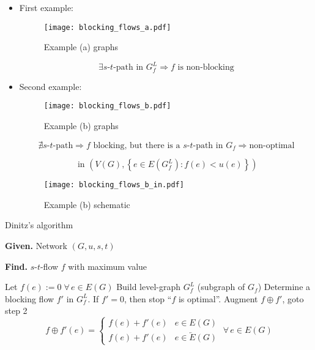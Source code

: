 \documentclass{article}
\newcommand{\set}[1]{\left\{#1\right\}}
\newcommand{\given}[1]{\textbf{Given.} #1\par}
\newcommand{\find}[1]{\textbf{Find.} #1\par}
\newcommand{\gath}[2]{$#1$-$#2$-path} %
\newcommand{\fall}{\;\forall\,}
\begin{document}
\begin{itemize}
  \item First example:
    \begin{figure}[!h]
      \begin{center}
       \texttt{[image: blocking\_flows\_a.pdf]}
       \caption{Example (a) graphs}
      \end{center}
    \end{figure}

    \[
      \exists \text{\gath st in }  G^L_f
        \Rightarrow f \text{ is non-blocking}
    \]

  \item Second example:
    \begin{figure}[!h]
      \begin{center}
       \texttt{[image: blocking\_flows\_b.pdf]}
       \caption{Example (b) graphs}
      \end{center}
    \end{figure}

    \[
      \nexists \text{\gath st}
        \Rightarrow f \text{ blocking, but there is a \gath st in } G_f \Rightarrow \text{non-optimal}
    \]

    \[
      \text{ in } (V(G), \set{e \in E(G^L_f): f(e) < u(e)})
    \]
    \begin{figure}[!h]
      \begin{center}
       \texttt{[image: blocking\_flows\_b\_in.pdf]}
       \caption{Example (b) schematic}
      \end{center}
    \end{figure}
\end{itemize}


\begin{algorithm}
  \caption{Dinitz's algorithm}
  \label{dinitz-algo}
  \given{Network $(G, u, s, t)$}
  \find{$s$-$t$-flow $f$ with maximum value}
\begin{algorithmic}[1]
  \State Let $f(e) := 0 \fall e \in E(G)$
  \State Build level-graph $G^L_f$ (subgraph of $G_f$)
  \State Determine a blocking flow $f'$ in $G^L_f$. If $f' = 0$, then stop ``$f$ is optimal''.
  \State Augment $f \oplus f'$, goto step 2
  \[
    f \oplus f'(e) = \begin{cases}
      f(e) + f'(e) & e \in E(G) \\
      f(e) + f'(e) & e \in \overleftarrow{E}(G)
    \end{cases}
    \fall e \in E(G)
  \]
\end{algorithmic}
\end{algorithm}
\end{document}
